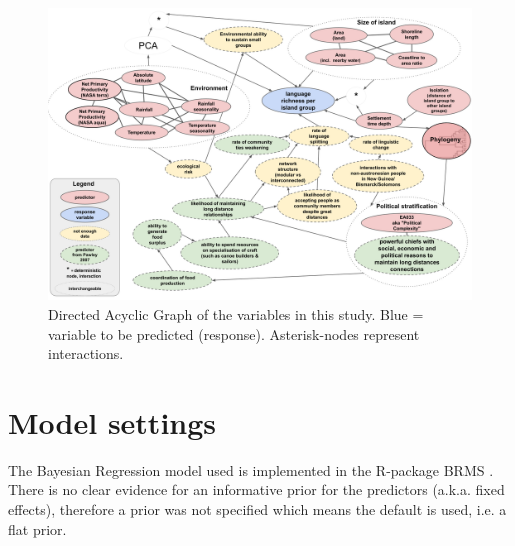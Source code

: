 \documentclass[12pt,letterpaper]{article}
\begin{document}



\begin{figure} 

\includegraphics[width=\textwidth]{Predicting_lgs_DAG_full}
\caption{Directed Acyclic Graph of the variables in this study. Blue = variable to be predicted (response). Asterisk-nodes represent interactions.}
\label{appendix_Predicting_lgs_DAG_full}
\end{figure}

\newpage

\section{Model settings}
\label{appendix_model_settings}
The Bayesian Regression model used is implemented in the R-package BRMS \citep{burkner2017brms}. There is no clear evidence for an informative prior for the predictors (a.k.a. fixed effects), therefore a prior was not specified which means the default is used, i.e. a flat prior.
\end{document}
